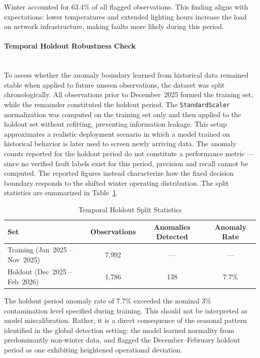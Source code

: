 \documentclass{article}
\begin{document}
Winter accounted for 63.4\% of all flagged observations. This finding
aligns with expectations: lower temperatures and extended lighting hours
increase the load on network infrastructure, making faults more likely
during this period.

\paragraph{Temporal Holdout Robustness Check}\mbox{}\\
To assess whether the anomaly boundary learned from historical data
remained stable when applied to future unseen observations, the dataset
was split chronologically. All observations prior to December~2025
formed the training set, while the remainder constituted the holdout
period. The \texttt{StandardScaler} normalization was computed on the
training set only and then applied to the holdout set without refitting,
preventing information leakage. This setup approximates a realistic
deployment scenario in which a model trained on historical behavior is
later used to screen newly arriving data. The anomaly counts reported
for the holdout period do not constitute a performance metric --- since
no verified fault labels exist for this period, precision and recall
cannot be computed. The reported figures instead characterize how the
fixed decision boundary responds to the shifted winter operating
distribution. The split statistics are summarized in
Table~\ref{tab:split}.

\begin{table}[h]
\centering
\caption{Temporal Holdout Split Statistics}
\label{tab:split}
\begin{tabular}{lccc}
\hline
\textbf{Set} & \textbf{Observations} & \textbf{Anomalies Detected} &
\textbf{Anomaly Rate} \\
\hline
Training (Jan~2025 -- Nov~2025) & 7{,}992 & --- & --- \\
Holdout  (Dec~2025 -- Feb~2026) & 1{,}786 & 138 & 7.7\% \\
\hline
\end{tabular}
\end{table}

The holdout period anomaly rate of 7.7\% exceeded the nominal 3\%
contamination level specified during training. This should not be
interpreted as model miscalibration. Rather, it is a direct consequence
of the seasonal pattern identified in the global detection setting: the
model learned normality from predominantly non-winter data, and flagged
the December--February holdout period as one exhibiting heightened
operational deviation.
\end{document}
